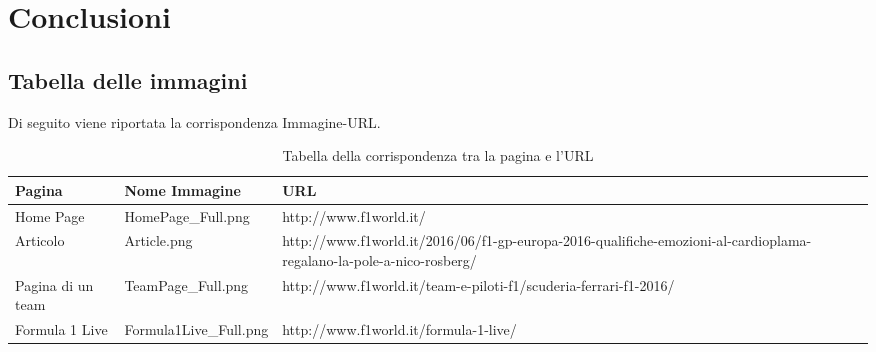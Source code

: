 \section{Conclusioni}
\subsection{Tabella delle immagini}

Di seguito viene riportata la corrispondenza Immagine-URL.

\begin{center}
  \begin{table}[H]
    \centering
    \begin{tabular}{| p{3cm} | p{4cm} | p{8cm} |}
      \hline
      \textbf{Pagina} & \textbf{Nome Immagine} & \textbf{URL} \tabularnewline \hline
		Home Page         & HomePage\_Full.png     & http://www.f1world.it/ \tabularnewline \hline
		Articolo          & Article.png            & http://www.f1world.it/2016/06/f1-gp-europa-2016-qualifiche-emozioni-al-cardioplama-regalano-la-pole-a-nico-rosberg/  \tabularnewline \hline
		Pagina di un team & TeamPage\_Full.png     & http://www.f1world.it/team-e-piloti-f1/scuderia-ferrari-f1-2016/  \tabularnewline \hline
		Formula 1 Live    & Formula1Live\_Full.png & http://www.f1world.it/formula-1-live/ \tabularnewline \hline
    \end{tabular}
    \caption{Tabella della corrispondenza tra la pagina e l'URL}
  \end{table}
\end{center}
